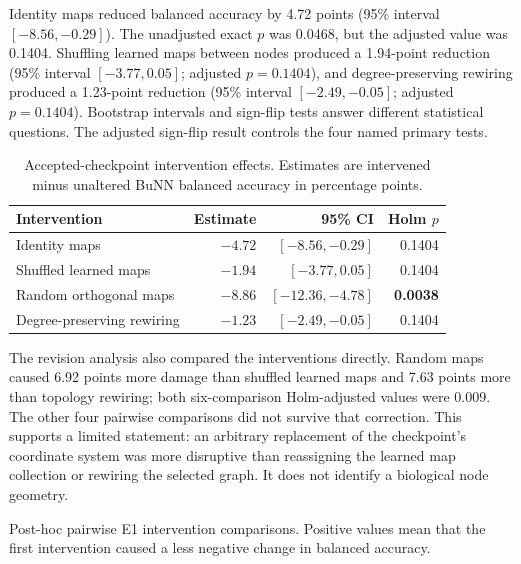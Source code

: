 \documentclass[11pt,a4paper]{article}
\begin{document}
Identity maps reduced balanced accuracy by 4.72 points (95\% interval
$[-8.56,-0.29]$). The unadjusted exact $p$ was 0.0468, but the adjusted value
was 0.1404. Shuffling learned maps between nodes produced a 1.94-point
reduction (95\% interval $[-3.77,0.05]$; adjusted $p=0.1404$), and
degree-preserving rewiring produced a 1.23-point reduction (95\% interval
$[-2.49,-0.05]$; adjusted $p=0.1404$). Bootstrap intervals and sign-flip tests
answer different statistical questions. The adjusted sign-flip result controls
the four named primary tests.

\begin{table}[htbp]
\centering
\caption{Accepted-checkpoint intervention effects. Estimates are intervened
minus unaltered BuNN balanced accuracy in percentage points.}
\label{tab:e1-primary}
\small
\begin{tabularx}{\textwidth}{@{}Y r r r@{}}
\toprule
\textbf{Intervention} & \textbf{Estimate} & \textbf{95\% CI} & \textbf{Holm $p$} \\
\midrule
Identity maps & $-4.72$ & $[-8.56,-0.29]$ & 0.1404 \\
Shuffled learned maps & $-1.94$ & $[-3.77,0.05]$ & 0.1404 \\
Random orthogonal maps & $-8.86$ & $[-12.36,-4.78]$ & \textbf{0.0038} \\
Degree-preserving rewiring & $-1.23$ & $[-2.49,-0.05]$ & 0.1404 \\
\bottomrule
\end{tabularx}
\end{table}

The revision analysis also compared the interventions directly. Random maps
caused 6.92 points more damage than shuffled learned maps and 7.63 points more
than topology rewiring; both six-comparison Holm-adjusted values were 0.009.
The other four pairwise comparisons did not survive that correction. This
supports a limited statement: an arbitrary replacement of the checkpoint's
coordinate system was more disruptive than reassigning the learned map
collection or rewiring the selected graph. It does not identify a biological
node geometry.

\begin{table}[htbp]
\centering
\caption{Post-hoc pairwise E1 intervention comparisons. Positive values mean
that the first intervention caused a less negative change in balanced accuracy.}
\label{tab:e1-pairwise}
\small

\end{table}
\end{document}
